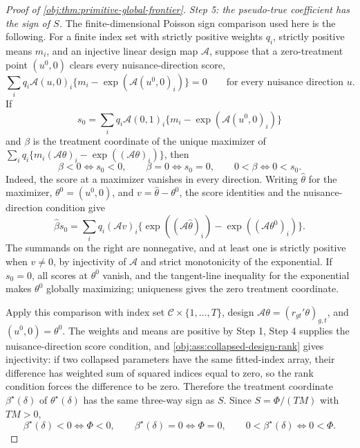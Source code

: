 \begin{proof}[Proof of \cref{obj:thm:primitive-global-frontier}]
\textit{Step 5: the pseudo-true coefficient has the sign of \(S\).} The finite-dimensional Poisson sign comparison used here is the following. For a finite index set with strictly positive weights \(q_i\), strictly positive means \(m_i\), and an injective linear design map \(\mathscr A\), suppose that a zero-treatment point \((u^0,0)\) clears every nuisance-direction score,
\[
\sum_i q_i \mathscr A(u,0)_i\{m_i-\exp(\mathscr A(u^0,0)_i)\}=0
\qquad\text{for every nuisance direction }u.
\]
If
\[
s_0=\sum_i q_i \mathscr A(0,1)_i\{m_i-\exp(\mathscr A(u^0,0)_i)\}
\]
and \(\beta\) is the treatment coordinate of the unique maximizer of
\(\sum_i q_i\{m_i(\mathscr A\theta)_i-\exp((\mathscr A\theta)_i)\}\), then
\[
\beta<0\iff s_0<0,
\qquad
\beta=0\iff s_0=0,
\qquad
0<\beta\iff 0<s_0 .
\]
Indeed, the score at a maximizer vanishes in every direction. Writing \(\widehat\theta\) for the maximizer, \(\theta^0=(u^0,0)\), and \(v=\widehat\theta-\theta^0\), the score identities and the nuisance-direction condition give
\[
\widehat\beta s_0
=
\sum_i q_i(\mathscr A v)_i\{\exp((\mathscr A\widehat\theta)_i)-\exp((\mathscr A\theta^0)_i)\} .
\]
The summands on the right are nonnegative, and at least one is strictly positive when \(v\neq0\), by injectivity of \(\mathscr A\) and strict monotonicity of the exponential. If \(s_0=0\), all scores at \(\theta^0\) vanish, and the tangent-line inequality for the exponential makes \(\theta^0\) globally maximizing; uniqueness gives the zero treatment coordinate.

Apply this comparison with index set \(\mathcal C\times\{1,\ldots,T\}\), design \(\mathscr A\theta=(r_{gt}'\theta)_{g,t}\), and \((u^0,0)=\theta^0\). The weights and means are positive by Step 1, Step 4 supplies the nuisance-direction score condition, and \cref{obj:ass:collapsed-design-rank} gives injectivity: if two collapsed parameters have the same fitted-index array, their difference has weighted sum of squared indices equal to zero, so the rank condition forces the difference to be zero. Therefore the treatment coordinate \(\beta^\star(\delta)\) of \(\theta^\star(\delta)\) has the same three-way sign as \(S\). Since \(S=\Phi/(TM)\) with \(TM>0\),
\[
\beta^\star(\delta)<0\iff \Phi<0,
\qquad
\beta^\star(\delta)=0\iff \Phi=0,
\qquad
0<\beta^\star(\delta)\iff 0<\Phi .
\]


\end{proof}
